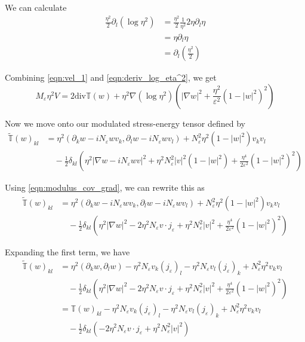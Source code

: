 \documentclass[a4paper]{article}
\renewcommand{\div}{\mathrm{div}}
\begin{document}
We can calculate
\begin{align}
  \frac{\eta^2}{2} \partial_l ( \log \eta^2 ) &= \frac{\eta^2}{2} \frac{1}{\eta^2} 2 \eta \partial_l \eta \nonumber \\
  &= \eta \partial_l \eta \nonumber \\
  &= \partial_l \left( \frac{\eta^2}{2} \right)
  \label{eqn:deriv_log_eta^2}
\end{align}

Combining \eqref{eqn:vel_1} and \eqref{eqn:deriv_log_eta^2}, we get
\begin{equation}
  M_\varepsilon \eta^2 V = 2 \div \mathbb{T}(w) + \eta^2 \nabla ( \log \eta^2 ) \left( | \nabla w |^2 + \frac{\eta^2}{\varepsilon^2} (1-|w|^2)^2
  \right)
  \label{eqn:div_stress_energy}
\end{equation}

Now we move onto our modulated stress-energy tensor defined by
\begin{align}
  \tilde{\mathbb{T}}(w)_{kl} &= \eta^2 ( \partial_k w - i N_\varepsilon w v_k, \partial_l w - i N_\varepsilon w v_l) + N_\varepsilon^2 \eta^2 (1-|w|^2)
  v_k v_l \nonumber \\
  &\quad - \frac{1}{2} \delta_{kl} \left( \eta^2 | \nabla w - i N_\varepsilon w v |^2 + \eta^2 N_\varepsilon^2 |v|^2 (1 - |w|^2) + \frac{\eta^4}{2 \varepsilon^2} (1-|w|^2)^2 \right)
  \label{eqn:def_mod_stress_energy}
\end{align}

Using \eqref{eqn:modulus_cov_grad}, we can rewrite this as
\begin{align}
  \tilde{\mathbb{T}}(w)_{kl} &= \eta^2 ( \partial_k w - i N_\varepsilon w v_k, \partial_l w - i N_\varepsilon w v_l) + N_\varepsilon^2 \eta^2 (1-|w|^2)
  v_k v_l \nonumber \\
  &\quad - \frac{1}{2} \delta_{kl} \left( \eta^2 | \nabla w |^2 - 2 \eta^2 N_\varepsilon v \cdot j_\varepsilon + \eta^2 N_\varepsilon^2 |v|^2 + \frac{\eta^4}{2 \varepsilon^2} (1-|w|^2)^2 \right)
  \label{eqn:mod_stress_energy}
\end{align}

Expanding the first term, we have
\begin{align}
  \tilde{\mathbb{T}}(w)_{kl} &= \eta^2 ( \partial_k w , \partial_l w ) - \eta^2 N_\varepsilon v_k (j_\varepsilon)_l - \eta^2 N_\varepsilon v_l
  (j_\varepsilon)_k + N_\varepsilon^2 \eta^2 v_k v_l \nonumber \\
  &\quad -\frac{1}{2} \delta_{kl} \left( \eta^2 | \nabla w |^2 - 2 \eta^2 N_\varepsilon v \cdot j_\varepsilon + \eta^2 N_\varepsilon^2 |v|^2 +
  \frac{\eta^4}{2 \varepsilon^2} (1-|w|^2)^2 \right) \nonumber \\
  &= \mathbb{T}(w)_{kl} - \eta^2 N_\varepsilon v_k (j_\varepsilon)_l - \eta^2 N_\varepsilon v_l (j_\varepsilon)_k + N_\varepsilon^2 \eta^2 v_k v_l
  \nonumber \\
  &\quad - \frac{1}{2} \delta_{kl} \left( - 2\eta^2 N_\varepsilon v \cdot j_\varepsilon + \eta^2 N_\varepsilon^2 |v|^2 \right)
  \label{eqn:stress_energy_expanded}
\end{align}
\end{document}
